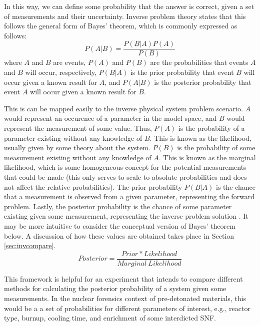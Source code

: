 In this way, we can define some probability that the answer is correct, given a
set of measurements and their uncertainty. Inverse problem theory states that
this follows the general form of Bayes' theorem, which is commonly expressed as
follows:
\begin{equation}
  \label{eq:bayes}
  P(A|B) = \frac{P(B|A)P(A)}{P(B)}
\end{equation}
where $A$ and $B$ are events, $P(A)$ and $P(B)$ are the probabilities that events
$A$ and $B$ will occur, respectively, $P(B|A)$ is the prior probability that event 
$B$ will occur given a known result for $A$, and $P(A|B)$ is the posterior 
probability that event $A$ will occur given a known result for $B$.

This is can be mapped easily to the inverse physical system problem scenario.
$A$ would represent an occurence of a parameter in the model space, and $B$
would represent the measurement of some value. Thus, $P(A)$ is the probability
of a parameter existing without any knowledge of $B$. This is known as the
likelihood, usually given by some theory about the system. $P(B)$ is the
probability of some measurement existing without any knowledge of $A$. This is
known as the marginal likelihood, which is some homogeneous concept for the
potential measurements that could be made (this only serves to scale to
absolute probabilities and does not affect the relative probabilities). The
prior probability $P(B|A)$ is the chance that a measurement is observed from a
given parameter, representing the forward problem.  Lastly, the posterior
probability is the chance of some parameter existing given some measurement,
representing the inverse problem solution \cite{inverse_theory}.  It may be
more intuitive to consider the conceptual version of Bayes' theorem below.  
A discussion of how these values are obtained takes place in Section
\ref{sec:invcompare}.
\begin{equation}
  \label{eq:bayes_words}
  Posterior = \frac{Prior * Likelihood}{Marginal \ Likelihood} 
\end{equation} 

This framework is helpful for an experiment that intends to compare different
methods for calculating the posterior probability of a system given some
measurements.  In the nuclear forensics context of pre-detonated materials,
this would be a a set of probabilities for different parameters of interest,
e.g., reactor type, burnup, cooling time, and enrichment of some interdicted
\gls{SNF}. 
